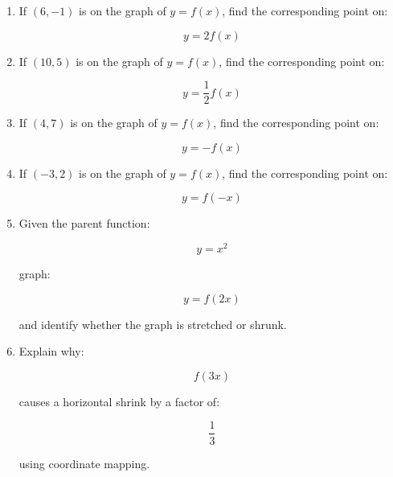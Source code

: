 \documentclass[11pt]{article}
\begin{document}
\begin{enumerate}
\item If $(6,-1)$ is on the graph of $y=f(x)$, find the corresponding point on:

\[
y=2f(x)
\]

\item If $(10,5)$ is on the graph of $y=f(x)$, find the corresponding point on:

\[
y=\frac12 f(x)
\]

\item If $(4,7)$ is on the graph of $y=f(x)$, find the corresponding point on:

\[
y=-f(x)
\]

\item If $(-3,2)$ is on the graph of $y=f(x)$, find the corresponding point on:

\[
y=f(-x)
\]

\item Given the parent function:

\[
y=x^2
\]

graph:

\[
y=f(2x)
\]

and identify whether the graph is stretched or shrunk.

\item Explain why:

\[
f(3x)
\]

causes a horizontal shrink by a factor of:

\[
\frac13
\]

using coordinate mapping.

\end{enumerate}
\end{document}
